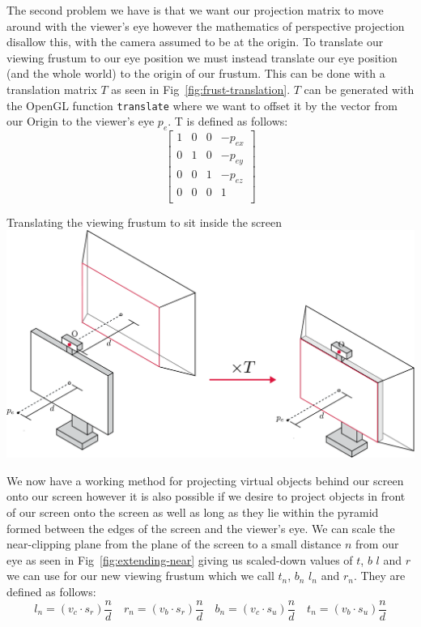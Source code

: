 The second problem we have is that we want our projection matrix to move around with the viewer's eye however the mathematics of perspective projection disallow this, with the camera assumed to be at the origin. To translate our viewing frustum to our eye position we must instead translate our eye position (and the whole world) to the origin of our frustum. This can be done with a translation matrix $T$ as seen in Fig~\ref{fig:frust-translation}. $T$ can be generated with the OpenGL function \texttt{translate} where we want to offset it by the vector from our Origin to the viewer's eye $p_e$. T is defined as follows:
\[
    \begin{bmatrix}
        1 & 0 & 0 & -p_{ex} \\
        0 & 1 & 0 & -p_{ey} \\
        0 & 0 & 1 & -p_{ez} \\
        0 & 0 & 0 & 1       \\
    \end{bmatrix}
\]

\begin{figureBox}[label={fig:frust-translation}, width=0.8\linewidth]{Translating the viewing frustum to sit inside the screen}
    \includegraphics[width = 0.8\linewidth]{./background/figures/projection/frust-translation.pdf}
\end{figureBox}

We now have a working method for projecting virtual objects behind our screen onto our screen however it is also possible if we desire to project objects in front of our screen onto the screen as well as long as they lie within the pyramid formed between the edges of the screen and the viewer's eye. We can scale the near-clipping plane from the plane of the screen to a small distance $n$ from our eye as seen in Fig~\ref{fig:extending-near} giving us scaled-down values of $t$, $b$ $l$ and $r$ we can use for our new viewing frustum which we call $t_n$, $b_n$ $l_n$ and $r_n$. They are defined as follows:
\[
    l_n = (v_c \cdot s_r) \frac{n}{d} \quad r_n = (v_b \cdot s_r) \frac{n}{d} \quad b_n = (v_c \cdot s_u) \frac{n}{d} \quad t_n = (v_b \cdot s_u) \frac{n}{d}
\]

